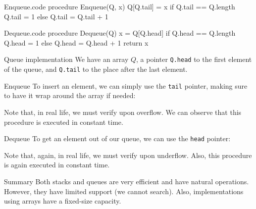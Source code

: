 \documentclass[a4paper]{article}
\begin{document}
\begin{filecontents*}[overwrite]{Enqueue.code}
procedure Enqueue(Q, x)
    Q[Q.tail] = x
    if Q.tail == Q.length
        Q.tail = 1
    else
        Q.tail = Q.tail + 1
\end{filecontents*}

\begin{filecontents*}[overwrite]{Dequeue.code}
procedure Dequeue(Q)
    x = Q[Q.head]
    if Q.head == Q.length
        Q.head = 1
    else
        Q.head = Q.head + 1
    return x
\end{filecontents*}


\begin{parag}{Queue implementation}
    We have an array $Q$, a pointer \texttt{Q.head} to the first element of the queue, and \texttt{Q.tail} to the place after the last element.

    \begin{subparag}{Enqueue}
        To insert an element, we can simply use the \texttt{tail} pointer, making sure to have it wrap around the array if needed:

        Note that, in real life, we must verify upon overflow. We can observe that this procedure is executed in constant time.
    \end{subparag}

    \begin{subparag}{Dequeue}
        To get an element out of our queue, we can use the \texttt{head} pointer:

        Note that, again, in real life, we must verify upon underflow. Also, this procedure is again executed in constant time.
    \end{subparag}
\end{parag}

\begin{parag}{Summary}
    Both stacks and queues are very efficient and have natural operations. However, they have limited support (we cannot search). Also, implementations using arrays have a fixed-size capacity.
\end{parag}
\end{document}
